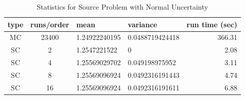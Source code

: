 \begin{table}[h!]
\begin{center}
\begin{tabular}{c c|l l| r}
type & runs/order & mean & variance & run time (sec) \\ \hline
MC & 23400 & 1.24922240195 & 0.0488719424418 & 366.31\\
SC & 2 & 1.2547221522 & 0 & 2.08 \\
SC & 4 & 1.25569029702 & 0.049198975952 & 3.11 \\
SC & 8 & 1.25569096924 & 0.0492316191443 & 4.74\\
SC & 16 & 1.25569096924 & 0.0492316191611 & 6.88
\end{tabular}
\end{center}
\caption{Statistics for Source Problem with Normal Uncertainty}
\label{tab:source norm}
\end{table}

